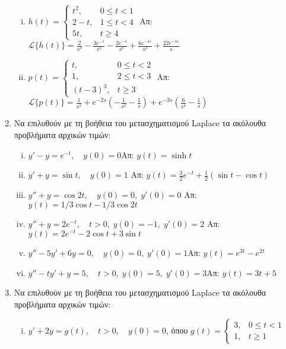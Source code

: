 \begin{enumerate}
\begin{enumerate}[i)]
      \item $h(t)=
        \begin{cases} 
          t^{2}, & 0\leq t<1 \\ 2-t, & 1\leq t < 4 \\ 5t, & t\geq 4
        \end{cases}$ 
        \hfill Απ: $\mathcal{L}\{h(t)\}=\frac{2}{s^{3}}-\frac{3e^{-s}}{s^{2}}-
        \frac{2e^{-s}}{s^{3}}+\frac{6e^{-4s}}{s^{2}}+\frac{22e^{-4s}}{s}$

      \item $p(t)=
        \begin{cases} 
          t, & 0\leq t< 2 \\ 1, & 2\leq t < 3 \\ (t-3)^{3}, & t\geq 3
        \end{cases}$ 
        \hfill Απ: $\mathcal{L}\{p(t)\}=\frac{1}{s^{2}}+e^{-2s}
        \left(-\frac{1}{s^{2}}-\frac{1}{s}\right)+e^{-3s}
        \left(\frac{6}{s^{4}}-\frac{1}{s}\right)$
    \end{enumerate}

  \item Να επιλυθούν με τη βοήθεια του μετασχηματισμού Laplace τα ακόλουθα 
    προβλήματα αρχικών τιμών:
    \begin{enumerate}[i)]
      \item $y'-y=e^{-t},\quad y(0)=0$\hfill Απ: $y(t)=\sinh t$
      \item $y'+y=\sin t,\quad y(0)=1$
        \hfill Απ: $y(t)=\frac{3}{2}e^{-t}+\frac{1}{2}(\sin t-\cos t)$
      \item $y''+y =\cos 2t, \quad y(0)=0, \; y'(0)=0$ 
        \hfill Απ: $y(t)={1}/{3}\cos t-{1}/{3}\cos 2t$
      \item $y''+y=2e^{-t},\quad t>0, \; y(0)=-1, \; y'(0)=2$
        \hfill Απ: $y(t)=2e^{-t}-2\cos t+3\sin t$
      \item $y''-5y'+6y=0,\quad y(0)=0, \; y'(0)=1$\hfill Απ: $y(t)=e^{3t}-e^{2t}$
      \item $y''-ty'+y=5, \quad t>0, \; y(0)=5, \; y'(0)=3$\hfill Απ: $y(t)=3t+5$
    \end{enumerate}

  \item Να επιλυθούν με τη βοήθεια του μετασχηματισμού Laplace τα ακόλουθα 
    προβλήματα αρχικών τιμών:
    \begin{enumerate}[i)]
      \item $y'+2y=g(t),\quad t>0,\quad y(0)=0$, 
        όπου $g(t)=
        \begin{cases}
          3, & 0\leq t<1 \\ 1, & t\geq 1
        \end{cases}$


\end{enumerate}
\end{enumerate}
